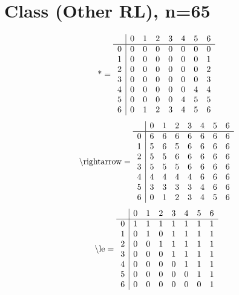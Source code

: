 \documentclass[11pt]{article}
\begin{document}
\section{Class (Other RL), n=65}
\[\text{*} = 
\begin{array}{r | r r r r r r r}
 & 0 & 1 & 2 & 3 & 4 & 5 & 6 \\ \hline
0 & 0 & 0 & 0 & 0 & 0 & 0 & 0 \\
1 & 0 & 0 & 0 & 0 & 0 & 0 & 1 \\
2 & 0 & 0 & 0 & 0 & 0 & 0 & 2 \\
3 & 0 & 0 & 0 & 0 & 0 & 0 & 3 \\
4 & 0 & 0 & 0 & 0 & 0 & 4 & 4 \\
5 & 0 & 0 & 0 & 0 & 4 & 5 & 5 \\
6 & 0 & 1 & 2 & 3 & 4 & 5 & 6 \\
\end{array}
\]
\[\text{\textbackslash rightarrow} = 
\begin{array}{r | r r r r r r r}
 & 0 & 1 & 2 & 3 & 4 & 5 & 6 \\ \hline
0 & 6 & 6 & 6 & 6 & 6 & 6 & 6 \\
1 & 5 & 6 & 5 & 6 & 6 & 6 & 6 \\
2 & 5 & 5 & 6 & 6 & 6 & 6 & 6 \\
3 & 5 & 5 & 5 & 6 & 6 & 6 & 6 \\
4 & 4 & 4 & 4 & 4 & 6 & 6 & 6 \\
5 & 3 & 3 & 3 & 3 & 4 & 6 & 6 \\
6 & 0 & 1 & 2 & 3 & 4 & 5 & 6 \\
\end{array}
\]
\[\text{\textbackslash le} = 
\begin{array}{r | r r r r r r r}
 & 0 & 1 & 2 & 3 & 4 & 5 & 6 \\ \hline
0 & 1 & 1 & 1 & 1 & 1 & 1 & 1 \\
1 & 0 & 1 & 0 & 1 & 1 & 1 & 1 \\
2 & 0 & 0 & 1 & 1 & 1 & 1 & 1 \\
3 & 0 & 0 & 0 & 1 & 1 & 1 & 1 \\
4 & 0 & 0 & 0 & 0 & 1 & 1 & 1 \\
5 & 0 & 0 & 0 & 0 & 0 & 1 & 1 \\
6 & 0 & 0 & 0 & 0 & 0 & 0 & 1 \\
\end{array}
\]
\end{document}

